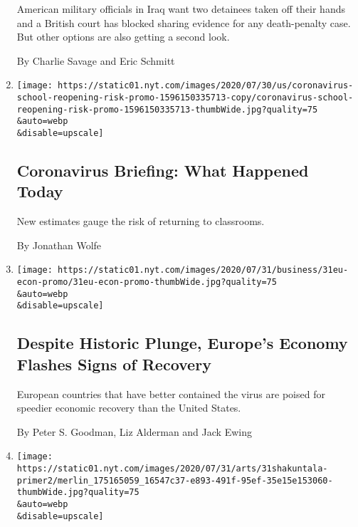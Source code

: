 \begin{enumerate}
  American military officials in Iraq want two detainees taken off their
  hands and a British court has blocked sharing evidence for any
  death-penalty case. But other options are also getting a second look.

  By Charlie Savage and Eric Schmitt
\item
  \href{/2020/07/31/us/coronavirus-today.html}{}

  \texttt{[image: https://static01.nyt.com/images/2020/07/30/us/coronavirus-school-reopening-risk-promo-1596150335713-copy/coronavirus-school-reopening-risk-promo-1596150335713-thumbWide.jpg?quality=75\\\&auto=webp\\\&disable=upscale]}

  \hypertarget{coronavirus-briefing-what-happened-today}{%
  \subsection{Coronavirus Briefing: What Happened
  Today}\label{coronavirus-briefing-what-happened-today}}

  New estimates gauge the risk of returning to classrooms.

  By Jonathan Wolfe
\item
  \href{/2020/07/31/business/europe-economy-recovery-coronavirus.html}{}

  \texttt{[image: https://static01.nyt.com/images/2020/07/31/business/31eu-econ-promo/31eu-econ-promo-thumbWide.jpg?quality=75\\\&auto=webp\\\&disable=upscale]}

  \hypertarget{despite-historic-plunge-europes-economy-flashes-signs-of-recovery}{%
  \subsection{Despite Historic Plunge, Europe's Economy Flashes Signs of
  Recovery}\label{despite-historic-plunge-europes-economy-flashes-signs-of-recovery}}

  European countries that have better contained the virus are poised for
  speedier economic recovery than the United States.

  By Peter S. Goodman, Liz Alderman and Jack Ewing
\item
  \href{/2020/07/31/movies/shakuntala-devi-movie.html}{}

  \texttt{[image: https://static01.nyt.com/images/2020/07/31/arts/31shakuntala-primer2/merlin\_175165059\_16547c37-e893-491f-95ef-35e15e153060-thumbWide.jpg?quality=75\\\&auto=webp\\\&disable=upscale]}

  \hypertarget{5-things-to-know-about-shakuntala-devi}{%
}
\end{enumerate}
